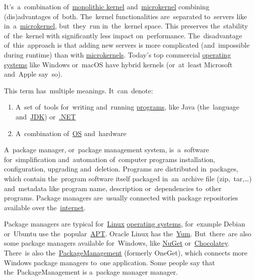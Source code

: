 \label{hybridkernel}
It's~a~combination of~\hyperref[monolithickernel]{monolithic kernel} and~\hyperref[microkernel]{microkernel} combining (dis)advantages of~both. The~kernel functionalities are~separated to~servers like in~a~\hyperref[microkernel]{microkernel}, but~they~run in~the~kernel space. This preserves the~stability of~the~kernel with significantly less impact on~performance. The~disadvantage of~this~approach is that adding new servers is more complicated (and~impossible during runtime) than with \hyperref[microkernel]{microkernels}. Today's top commercial \hyperref[os]{operating systems} like Windows or~macOS have hybrid kernels (or~at~least Microsoft and~Apple say~so).

\label{platform}
This term has~multiple meanings. It~can~denote:
\begin{enumerate}[label=\arabic*)]
    \item A~set of~tools for~writing and~running \hyperref[applicationprocessprogramservicethread]{programs}, like Java (the~language and~\hyperref[jdkjrejvm]{JDK}) or~\hyperref[dotnet]{.NET}
    \item A~combination of~\hyperref[os]{OS} and~hardware
\end{enumerate}

\label{packagemanager}
A~package manager, or~package management system, is~a~software for~simplification and~automation of~computer programs installation, configuration, upgrading and~deletion. Programs are distributed in~packages, which contain the~program software itself packaged in~an~archive file (zip,~tar,\dots) and~metadata like program name, description or~dependencies to~other programs. Package managers are~usually connected with package repositories available over the~\hyperref[internetweb]{internet}.

Package managers are typical for~\hyperref[linux]{Linux} \hyperref[os]{operating systems}, for~example Debian or~Ubuntu use the~popular~\hyperref[linuxapt]{APT}. Oracle Linux has the~\href{http://yum.baseurl.org/}{Yum}. But~there~are also some package managers available for~Windows, like \href{https://www.nuget.org/}{NuGet} or~\href{https://chocolatey.org/}{Chocolatey}. There~is also the~\hyperref[windowspackagemanagement]{PackageManagement} (formerly OneGet), which connects more Windows package managers to~one application. Some people say that the~PackageManagement is a~package manager manager.

